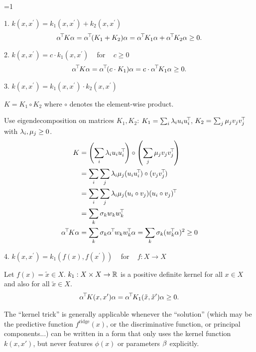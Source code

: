 \ifnum\value{solutions}=1
\begin{solution}
	1. $k(x,x^\prime) = k_1(x,x^\prime) + k_2(x,x^\prime)$
	\begin{align*}
		\a^\T K\a = \a^\T (K_1 + K_2)\a = \a^\T K_1\a + \a^\T K_2\a \ge 0.
	\end{align*}

	2. $k(x,x^\prime) = c\cdot k_1(x,x^\prime)$ ~ for ~ $c \ge 0$
	\begin{align*}
		\alpha^{\!\top\!} K\alpha = \alpha^{\!\top\!} (c\cdot K_1)\alpha = c\cdot \alpha^{\!\top\!} K_1\alpha \ge 0.
	\end{align*}

	3. $k(x,x^\prime) = k_1(x,x^\prime) \cdot k_2(x,x^\prime)$
	
	$K = K_1 \circ K_2$ where $\circ$ denotes the element-wise product.
	
	Use eigendecomposition on matrices $K_1, K_2$:
	$K_1 = \sum_i \lambda_i u_i u_i^{\!\top\!}$, $K_2 = \sum_j \mu_j v_j v_j^{\!\top\!}$ with $\lambda_i, \mu_j \ge 0$.
	\begin{align*}
		K &= \left(\sum_i \l_i u_i u_i^\T\right) \circ \left(\sum_j \m_j v_j v_j^\T\right) \\
		&= \sum_i \sum_j \l_i \m_j (u_i u_i^\T) \circ (v_j v_j^\T) \\
		&= \sum_i \sum_j \l_i \m_j (u_i \circ v_j) (u_i \circ v_j)^\T \\
		&= \sum_k \s_k w_k w_k^\T \\
		\a^\T K\a &= \sum_k \s_k \a^\T w_k w_k^\T \a 
		= \sum_k \s_k (w_k^\T \a)^2 \ge 0
	\end{align*}

	4. $k(x,x^\prime) = k_1(f(x),f(x^\prime))$ ~ for ~ $f:X\to X$
	
	Let $f(x) = \tilde{x} \in X$. $k_1: X\times X \to {\mathbb{R}}$ is a positive definite kernel
	for all $x \in X$ and also for all $\tilde{x} \in X$.
	\begin{align*}
		\alpha^{\!\top\!} K(x,x^\prime)\alpha = \alpha^{\!\top\!} K_1(\tilde{x},\tilde{x}^\prime)\alpha \ge 0.
	\end{align*}
\end{solution}
\fi



The ``kernel trick'' is generally applicable whenever the ``solution''
(which may be the predictive function $f^\text{ridge}(x)$, or the
discriminative function, or principal components...) can be written in
a form that only uses the kernel function $k(x,x')$, but never features
$\phi(x)$ or parameters $\beta$ explicitly.

